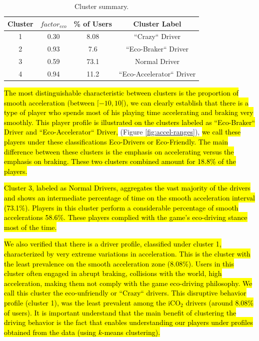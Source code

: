 \documentclass[preprint,authoryear,12pt]{elsarticle}
\newcommand{\hlc}[2][yellow]{ {\sethlcolor{#1} \hl{#2}} }
\begin{document}
\begin{table}[!h]
	\renewcommand*{\arraystretch}{1.4}
	\caption{Cluster summary.}
	\begin{center}
		\begin{tabular}{c|c|c|c}
			Cluster & $factor_{eco}$ & \% of Users & Cluster Label \\
			\hline
			1 &	 0.30
			& 8.08  & ``Crazy`` Driver  \\
			
			2 & 0.93
			& 7.6  &  ``Eco-Braker`` Driver \\
			
			3 &	 0.59
			& 73.1  &  Normal Driver  \\
			
			4 & 0.94
			& 11.2  &  ``Eco-Accelerator`` Driver \\
		\end{tabular}
	\end{center}
	\label{T:factors}
\end{table}


\hlc[green]{
The most distinguishable characteristic between clusters is the proportion of smooth acceleration (between $[-10, 10[$), we can clearly establish that there is a type of player who spends most of his playing time accelerating and braking very smoothly. This player profile is illustrated on the clusters labeled as ``Eco-Braker`` Driver and  ``Eco-Accelerator`` Driver, 
}(Figure \ref{fig:accel-ranges}),
\hlc[green]{ we call these players under these classifications Eco-Drivers or Eco-Friendly. The main difference between these clusters is the emphasis on accelerating versus the emphasis on braking. These two clusters combined amount for 18.8\% of the players.
}

\hlc[green]{
Cluster 3, labeled as Normal Drivers, aggregates the vast majority of the drivers and shows an intermediate percentage of time on the smooth acceleration interval (73.1\%). Players in this cluster perform a considerable percentage of smooth accelerations 58.6\%. These players complied with the game's eco-driving stance most of the time.
}

\hlc[green]{
We also verified that there is a driver profile, classified under cluster 1, characterized by very extreme variations in acceleration. This is the cluster with the least prevalence on the smooth acceleration zone (8.08\%). Users in this cluster often engaged in abrupt braking, collisions with the world, high acceleration, making them not comply with the game eco-driving philosophy. We call this cluster the eco-unfriendly or ``Crazy`` drivers. 
This disruptive behavior profile (cluster 1), was the least prevalent among the iCO$_2$ drivers (around 8.08\% of users).
It is important understand that the main benefit of clustering the driving behavior is the fact that enables understanding our players under profiles obtained from the data (using $k$-means clustering).
}
\end{document}
